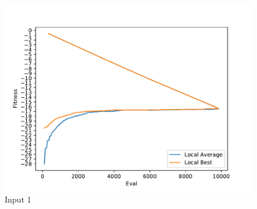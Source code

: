 \documentclass{standalone}
\begin{document}
\begin{figure}[!htb]
	\caption{Input 1}
	\label{fig:graph_1014}
	\includegraphics[width=\textwidth]{../graphs/graphs/1014.pdf}
\end{figure}
\end{document}
